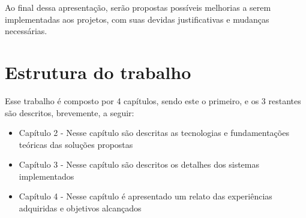 Ao final dessa apresentação, serão propostas possíveis melhorias a serem implementadas aos projetos, com suas devidas justificativas e mudanças necessárias.


\section{Estrutura do trabalho}

Esse trabalho é composto por 4 capítulos, sendo este o primeiro, e os 3 restantes são descritos, brevemente, a seguir:

\begin{itemize}
    \item Capítulo 2 - Nesse capítulo são descritas as tecnologias e fundamentações teóricas das soluções propostas
    \item Capítulo 3 - Nesse capítulo são descritos os detalhes dos sistemas implementados
    \item Capítulo 4 - Nesse capítulo é apresentado um relato das experiências adquiridas e objetivos alcançados
\end{itemize}
